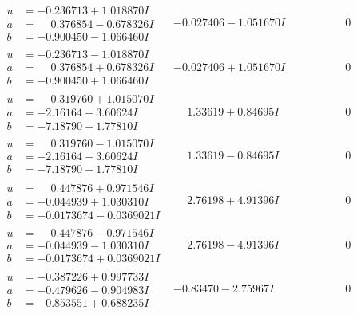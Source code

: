 \documentclass[1p]{elsarticle_modified}
\theoremstyle{definition}
\begin{document}
$$\begin{array}{c|c|c}
\begin{aligned}
u &= -0.236713 + 1.018870 I \\
a &= \phantom{-}0.376854 - 0.678326 I \\
b &= -0.900450 - 1.066460 I\end{aligned}
 & -0.027406 - 1.051670 I & \phantom{-0.000000 } 0 \\ \hline\begin{aligned}
u &= -0.236713 - 1.018870 I \\
a &= \phantom{-}0.376854 + 0.678326 I \\
b &= -0.900450 + 1.066460 I\end{aligned}
 & -0.027406 + 1.051670 I & \phantom{-0.000000 } 0 \\ \hline\begin{aligned}
u &= \phantom{-}0.319760 + 1.015070 I \\
a &= -2.16164 + 3.60624 I \\
b &= -7.18790 - 1.77810 I\end{aligned}
 & \phantom{-}1.33619 + 0.84695 I & \phantom{-0.000000 } 0 \\ \hline\begin{aligned}
u &= \phantom{-}0.319760 - 1.015070 I \\
a &= -2.16164 - 3.60624 I \\
b &= -7.18790 + 1.77810 I\end{aligned}
 & \phantom{-}1.33619 - 0.84695 I & \phantom{-0.000000 } 0 \\ \hline\begin{aligned}
u &= \phantom{-}0.447876 + 0.971546 I \\
a &= -0.044939 + 1.030310 I \\
b &= -0.0173674 - 0.0369021 I\end{aligned}
 & \phantom{-}2.76198 + 4.91396 I & \phantom{-0.000000 } 0 \\ \hline\begin{aligned}
u &= \phantom{-}0.447876 - 0.971546 I \\
a &= -0.044939 - 1.030310 I \\
b &= -0.0173674 + 0.0369021 I\end{aligned}
 & \phantom{-}2.76198 - 4.91396 I & \phantom{-0.000000 } 0 \\ \hline\begin{aligned}
u &= -0.387226 + 0.997733 I \\
a &= -0.479626 - 0.904983 I \\
b &= -0.853551 + 0.688235 I\end{aligned}
 & -0.83470 - 2.75967 I & \phantom{-0.000000 } 0 \\ \hline\begin{aligned}

\end{aligned}
\end{array}$$
\end{document}
